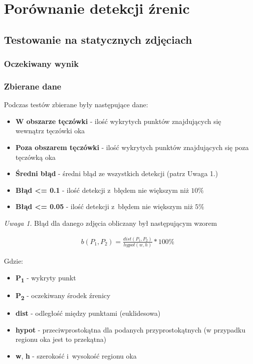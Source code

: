 \newpage
\section{Porównanie detekcji źrenic}


\subsection{Testowanie na statycznych zdjęciach}

\subsubsection{Oczekiwany wynik}

\subsubsection{Zbierane dane}

Podczas testów zbierane były następujące dane:

\begin{itemize}
    \item \textbf{W obszarze tęczówki} - ilość wykrytych punktów znajdujących się wewnątrz tęczówki oka
    \item \textbf{Poza obszarem tęczówki} - ilość wykrytych punktów znajdujących się poza tęczówką oka
    \item \textbf{Średni błąd} - średni błąd ze wszystkich detekcji (patrz Uwaga 1.)
    \item \textbf{Błąd <= 0.1} - ilość detekcji z~błędem nie większym niż $10\%$
    \item \textbf{Błąd <= 0.05} - ilość detekcji z~błędem nie większym niż $5\%$
\end{itemize}

\par

\textit{Uwaga 1.} Błąd dla danego zdjęcia obliczany był następującym wzorem

\begin{align}
    b(P_1, P_2) = \frac{dist(P_1, P_2)}{hypot(w, h)} * 100\%
\end{align}

Gdzie:

\begin{itemize}
    \item \textbf{P\textsubscript{1}} - wykryty punkt
    \item \textbf{P\textsubscript{2}} - oczekiwany środek źrenicy
    \item \textbf{dist} - odległość między punktami (euklidesowa)
    \item \textbf{hypot} - przeciwprostokątna dla podanych przyprostokątnych (w przypadku regionu oka jest to przekątna)
    \item \textbf{w}, \textbf{h} - szerokość i~wysokość regionu oka
\end{itemize}



